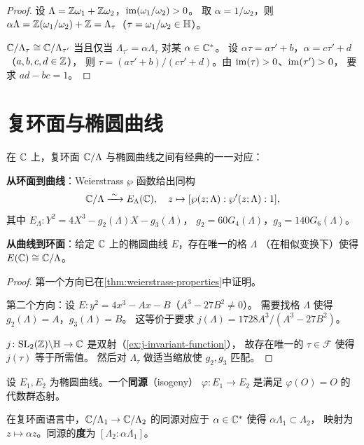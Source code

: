 \begin{proof}
设 $\Lambda = \mathbb{Z}\omega_1 + \mathbb{Z}\omega_2$，$\operatorname{im}(\omega_1/\omega_2) > 0$。
取 $\alpha = 1/\omega_2$，则 $\alpha\Lambda = \mathbb{Z}(\omega_1/\omega_2) + \mathbb{Z}
= \Lambda_\tau$（$\tau = \omega_1/\omega_2 \in \mathbb{H}$）。

$\mathbb{C}/\Lambda_\tau \cong \mathbb{C}/\Lambda_{\tau'}$ 当且仅当
$\Lambda_{\tau'} = \alpha \Lambda_\tau$ 对某 $\alpha \in \mathbb{C}^*$。
设 $\alpha \tau = a\tau' + b$，$\alpha = c\tau' + d$（$a,b,c,d \in \mathbb{Z}$），
则 $\tau = (a\tau' + b)/(c\tau' + d)$。由 $\operatorname{im}(\tau) > 0$、$\operatorname{im}(\tau') > 0$，
要求 $ad - bc = 1$。
\end{proof}


\section{复环面与椭圆曲线}
\label{sec:tori-and-ec}

\begin{theorem}[均匀化定理]
\label{thm:uniformization}
在 $\mathbb{C}$ 上，复环面 $\mathbb{C}/\Lambda$ 与椭圆曲线之间有经典的一一对应：

\textbf{从环面到曲线}：Weierstrass $\wp$ 函数给出同构
\[
  \mathbb{C}/\Lambda \xrightarrow{\;\sim\;} E_\Lambda(\mathbb{C}), \quad
  z \mapsto [\wp(z;\Lambda) : \wp'(z;\Lambda) : 1],
\]
其中 $E_\Lambda\colon Y^2 = 4X^3 - g_2(\Lambda)X - g_3(\Lambda)$，
$g_2 = 60G_4(\Lambda)$，$g_3 = 140G_6(\Lambda)$。

\textbf{从曲线到环面}：给定 $\mathbb{C}$ 上的椭圆曲线 $E$，存在唯一的格 $\Lambda$
（在相似变换下）使得 $E(\mathbb{C}) \cong \mathbb{C}/\Lambda$。
\end{theorem}

\begin{proof}
第一个方向已在\cref{thm:weierstrass-properties}中证明。

第二个方向：设 $E\colon y^2 = 4x^3 - Ax - B$（$A^3 - 27B^2 \neq 0$）。
需要找格 $\Lambda$ 使得 $g_2(\Lambda) = A$，$g_3(\Lambda) = B$。
这等价于要求 $j(\Lambda) = 1728 A^3/(A^3 - 27B^2)$。

$j\colon \mathrm{SL}_2(\mathbb{Z}) \backslash \mathbb{H} \to \mathbb{C}$ 是双射（\cref{ex:j-invariant-function}），
故存在唯一的 $\tau \in \mathcal{F}$ 使得 $j(\tau)$ 等于所需值。
然后对 $\Lambda_\tau$ 做适当缩放使 $g_2, g_3$ 匹配。
\end{proof}

\begin{definition}[同源]
\label{def:isogeny}
设 $E_1, E_2$ 为椭圆曲线。一个\textbf{同源}（isogeny）
$\varphi\colon E_1 \to E_2$ 是满足 $\varphi(O) = O$ 的代数群态射。

在复环面语言中，$\mathbb{C}/\Lambda_1 \to \mathbb{C}/\Lambda_2$ 的同源对应于
$\alpha \in \mathbb{C}^*$ 使得 $\alpha\Lambda_1 \subset \Lambda_2$，
映射为 $z \mapsto \alpha z$。同源的\textbf{度}为 $[\Lambda_2 : \alpha\Lambda_1]$。
\end{definition}


